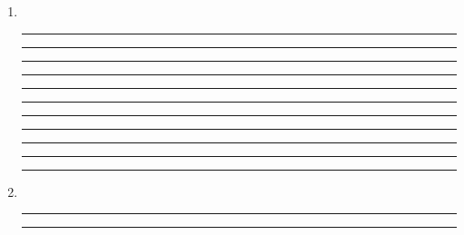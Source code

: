 \documentclass[a4paper,10pt]{article}
\begin{document}
\begin{enumerate}
\begin{enumerate}
\item~

\vspace{7mm}\hrule
\vspace{7mm}\hrule\vspace{7mm}\hrule\vspace{7mm}\hrule\vspace{7mm}\hrule
\vspace{7mm}\hrule\vspace{7mm}\hrule\vspace{7mm}\hrule\vspace{7mm}\hrule
\vspace{7mm}\hrule\vspace{7mm}\hrule\vspace{3mm}

\item~
\vspace{7mm}\hrule\vspace{7mm}\hrule\vspace{3mm}


\end{enumerate}

\end{enumerate}
\end{document}

